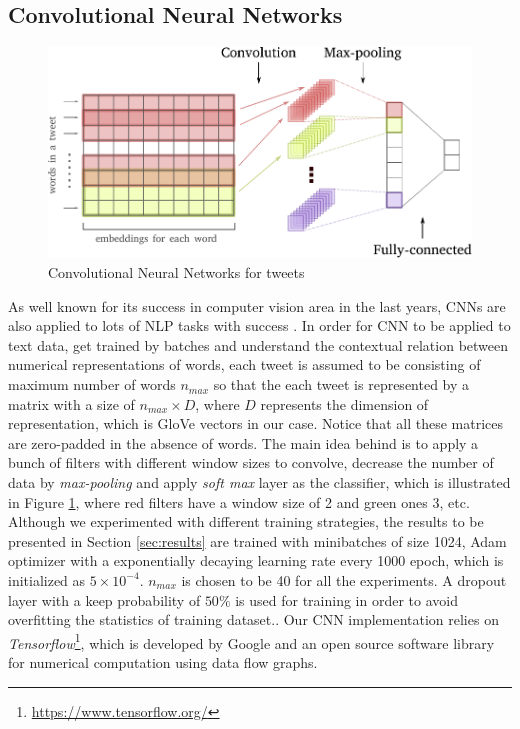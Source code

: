 \subsection{Convolutional Neural Networks}
\begin{figure}[h!]
	\centering
	\includegraphics[width=0.8\columnwidth]{CNN_text.pdf}
	\caption{Convolutional Neural Networks for tweets}
	\label{fig:cnn}
\end{figure}

As well known for its success in computer vision area in the last years, CNNs are also applied to lots of NLP tasks with success \cite{kim14conv}. 
In order for CNN to be applied to text data, get trained by batches and understand the contextual relation between numerical representations of words, each tweet is assumed to be consisting of maximum number of words $n_{max}$ so that the each tweet is represented by a matrix with a size of $n_{max} \times D$, where $D$ represents the dimension of representation, which is GloVe vectors in our case.
Notice that all these matrices are zero-padded in the absence of words.
The main idea behind is to apply a bunch of filters with different window sizes to convolve, decrease the number of data by \textit{max-pooling} and apply \textit{soft max} layer as the classifier, which is illustrated in Figure \ref{fig:cnn}, where red filters have a window size of 2 and green ones 3, etc.
Although we experimented with different training strategies, the results to be presented in Section \ref{sec:results} are trained with minibatches of size 1024, Adam optimizer with a exponentially decaying learning rate every 1000 epoch, which is initialized as $5 \times 10^{-4}$. 
$n_{max}$ is chosen to be 40 for all the experiments.
A dropout layer with a keep probability of $50\%$ is used for training in order to avoid overfitting the statistics of training dataset..
Our CNN implementation relies on \textit{Tensorflow}\footnote{\url{https://www.tensorflow.org/}}, which is developed by Google and an open source software library for numerical computation using data flow graphs.